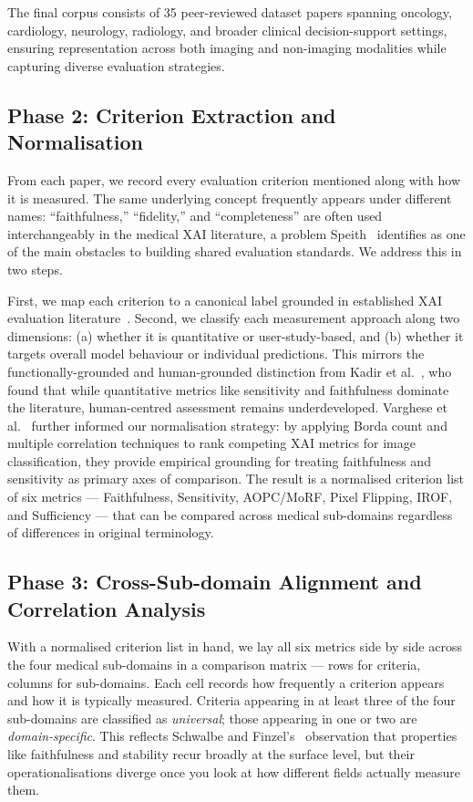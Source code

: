 The final corpus consists of 35 peer-reviewed dataset papers spanning oncology, cardiology, neurology, radiology, and broader clinical decision-support settings, ensuring representation across both imaging and non-imaging modalities while capturing diverse evaluation strategies.
\subsection{Phase 2: Criterion Extraction and Normalisation}

From each paper, we record every evaluation criterion mentioned along with
how it is measured. The same underlying concept frequently appears under
different names: ``faithfulness,'' ``fidelity,'' and ``completeness'' are
often used interchangeably in the medical XAI literature, a problem
Speith~\cite{speith2022review} identifies as one of the main obstacles to
building shared evaluation standards. We address this in two steps.

First, we map each criterion to a canonical label grounded in established
XAI evaluation literature~\cite{rosenfeld2021better, kadir2023evaluation}.
Second, we classify each measurement approach along two dimensions:
(a) whether it is quantitative or user-study-based, and (b) whether it
targets overall model behaviour or individual predictions. This mirrors
the functionally-grounded and human-grounded distinction from Kadir et
al.~\cite{kadir2023evaluation}, who found that while quantitative metrics
like sensitivity and faithfulness dominate the literature, human-centred
assessment remains underdeveloped. Varghese et al.~\cite{Varghese2025OnDE}
further informed our normalisation strategy: by applying Borda count and
multiple correlation techniques to rank competing XAI metrics for image
classification, they provide empirical grounding for treating faithfulness
and sensitivity as primary axes of comparison. The result is a normalised criterion
list of six metrics --- Faithfulness, Sensitivity, AOPC/MoRF, Pixel
Flipping, IROF, and Sufficiency --- that can be compared across medical
sub-domains regardless of differences in original terminology.

\subsection{Phase 3: Cross-Sub-domain Alignment and Correlation Analysis}

With a normalised criterion list in hand, we lay all six metrics side by
side across the four medical sub-domains in a comparison matrix --- rows
for criteria, columns for sub-domains. Each cell records how frequently a
criterion appears and how it is typically measured. Criteria appearing in
at least three of the four sub-domains are classified as
\emph{universal}; those appearing in one or two are
\emph{domain-specific}. This reflects Schwalbe and
Finzel's~\cite{schwalbe2024comprehensive} observation that properties like
faithfulness and stability recur broadly at the surface level, but their
operationalisations diverge once you look at how different fields actually
measure them.

